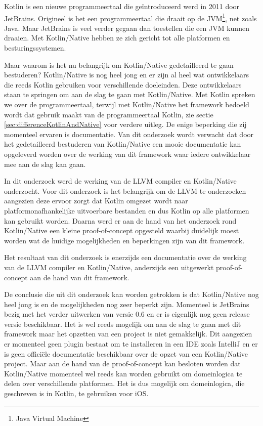 Kotlin is een nieuwe programmeertaal die geïntroduceerd werd in 2011 door JetBrains. Origineel is het een programmeertaal die draait op de JVM\footnote{Java Virtual Machine}, net zoals Java. Maar JetBrains is veel verder gegaan dan toestellen die een JVM kunnen draaien. Met Kotlin/Native hebben ze zich gericht tot alle platformen en besturingssystemen. 


Maar waarom is het nu belangrijk om Kotlin/Native gedetailleerd te gaan bestuderen? Kotlin/Native is nog heel jong en er zijn al heel wat ontwikkelaars die reeds Kotlin gebruiken voor verschillende doeleinden. Deze ontwikkelaars staan te springen om aan de slag te gaan met Kotlin/Native. Met Kotlin spreken we over de programmeertaal, terwijl met Kotlin/Native het framework bedoeld wordt dat gebruik maakt van de programmeertaal Kotlin, zie sectie \ref{sec:differenceKotlinAndNative} voor verdere uitleg. De enige beperking die zij momenteel ervaren is documentatie. Van dit onderzoek wordt verwacht dat door het gedetailleerd bestuderen van Kotlin/Native een mooie documentatie kan opgeleverd worden over de werking van dit framework waar iedere ontwikkelaar mee aan de slag kan gaan.

In dit onderzoek werd de werking van de LLVM compiler en Kotlin/Native onderzocht. Voor dit onderzoek is het belangrijk om de LLVM te onderzoeken aangezien deze ervoor zorgt dat Kotlin omgezet wordt naar platformonafhankelijke uitvoerbare bestanden en dus Kotlin op alle platformen kan gebruikt worden. Daarna werd er aan de hand van het onderzoek rond Kotlin/Native een kleine proof-of-concept opgesteld waarbij duidelijk moest worden wat de huidige mogelijkheden en beperkingen zijn van dit framework.

Het resultaat van dit onderzoek is enerzijds een documentatie over de werking van de LLVM compiler en Kotlin/Native, anderzijds een uitgewerkt proof-of-concept aan de hand van dit framework.

De conclusie die uit dit onderzoek kan worden getrokken is dat Kotlin/Native nog heel jong is en de mogelijkheden nog zeer beperkt zijn. Momenteel is JetBrains bezig met het verder uitwerken van versie 0.6 en er is eigenlijk nog geen release versie beschikbaar. Het is wel reeds mogelijk om aan de slag te gaan met dit framework maar het opzetten van een project is niet gemakkelijk. Dit aangezien er momenteel geen plugin bestaat om te installeren in een IDE zoals IntelliJ en er is geen officiële documentatie beschikbaar over de opzet van een Kotlin/Native project. Maar aan de hand van de proof-of-concept kan besloten worden dat Kotlin/Native momenteel wel reeds kan worden gebruikt om domeinlogica te delen over verschillende platformen. Het is dus mogelijk om domeinlogica, die geschreven is in Kotlin, te gebruiken voor iOS.

